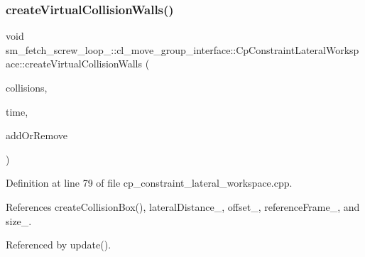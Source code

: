 \subsubsection{\texorpdfstring{create\+Virtual\+Collision\+Walls()}{createVirtualCollisionWalls()}}
{\footnotesize\ttfamily void sm\+\_\+fetch\+\_\+screw\+\_\+loop\+\_\+::cl\+\_\+move\+\_\+group\+\_\+interface\+::\+Cp\+Constraint\+Lateral\+Workspace\+::create\+Virtual\+Collision\+Walls (\begin{DoxyParamCaption}\item[{std\+::vector$<$ moveit\+\_\+msgs\+::\+Collision\+Object $>$ \&}]{collisions,  }\item[{const ros\+::\+Time \&}]{time,  }\item[{int}]{add\+Or\+Remove }\end{DoxyParamCaption})}



Definition at line 79 of file cp\+\_\+constraint\+\_\+lateral\+\_\+workspace.\+cpp.



References create\+Collision\+Box(), lateral\+Distance\+\_\+, offset\+\_\+, reference\+Frame\+\_\+, and size\+\_\+.



Referenced by update().



